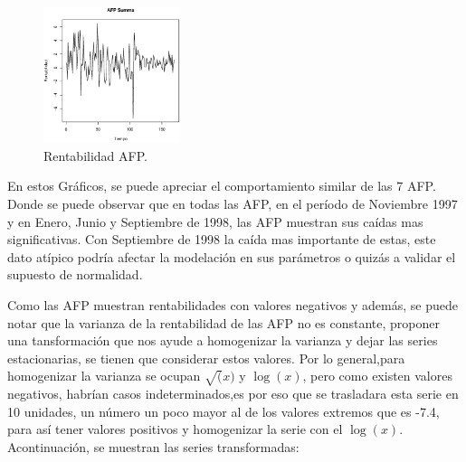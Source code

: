 \begin{figure}[!ht]
\begin{center}
  \includegraphics[height=4cm, width=4cm]{afp7.eps}
   \caption{Rentabilidad AFP.}
\label{caja}
\end{center}
\end{figure}

En estos Gr\'aficos, se puede apreciar el comportamiento similar de las 7 AFP. Donde se puede observar que en todas las AFP, en el per\'iodo de Noviembre 1997 y en Enero, Junio y Septiembre de 1998, las AFP muestran sus ca\'idas mas significativas. Con Septiembre de 1998 la ca\'ida mas importante de estas, este  dato at\'ipico podr\'ia afectar la modelaci\'on en sus par\'ametros o quiz\'as a validar el supuesto de normalidad.

Como las AFP muestran rentabilidades con valores negativos y adem\'as, se puede notar que la varianza de la rentabilidad de las AFP no es constante, proponer una tansformaci\'on que nos ayude a homogenizar la varianza y dejar las series estacionarias, se tienen que considerar estos valores. Por lo general,para homogenizar la varianza se ocupan $\sqrt(x)$ y $\log(x)$, pero como existen valores negativos, habr\'ian casos indeterminados,es por eso que se trasladara esta serie en 10 unidades, un n\'umero un poco mayor al de los valores extremos que es -7.4, para as\'i tener valores positivos y homogenizar la serie con el $\log(x)$. Acontinuaci\'on, se muestran las series transformadas:

